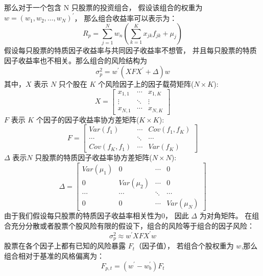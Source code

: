 \documentclass[UTF8,11pt]{ctexart}
\begin{document}
那么对于一个包含 N 只股票的投资组合， 假设该组合的权重为  $w=(w_1,w_2,\ldots,w_N)^\prime$， 那么组合收益率可以表示为：
\begin{equation}
R_p=\sum_{j=1}^{N}w_n(\sum_{k=1}^{K}x_{jk}f_{jk}+\mu_j)
\end{equation}
假设每只股票的特质因子收益率与共同因子收益率不想管， 并且每只股票的特质因子收益率也不相关。那么组合的风险结构为
\begin{equation}
\sigma_p^2=w^\prime(XFX^\prime+\Delta)w
\end{equation}
其中，$X$ 表示 $N$ 只个股在 $K$ 个风险因子上的因子载荷矩阵($N \times K$):
\begin{equation}
	X=\begin{bmatrix}
	x_{1,1} & \cdots & x_{1,K}\\
	\vdots & \ddots & \vdots\\
	x_{N,1} & \cdots & x_{N,K}
	\end{bmatrix}
\end{equation}
$F$ 表示 $K$ 个因子的因子收益率协方差矩阵($K \times K$):
\begin{equation}
F=\begin{bmatrix}
Var(f_1) & \cdots & Cov(f_1,f_K)\\
\cdots & \ddots & \cdots\\
Cov(f_K,f_1) & \cdots & Var(f_K)
\end{bmatrix}
\end{equation}
$\Delta$ 表示$N$ 只股票的特质因子收益率协方差矩阵($N \times N$):
\begin{equation}
\Delta=\begin{bmatrix}
Var(\mu_1) & 0 & \cdots &0\\
0 &Var(\mu_2)& \cdots & 0\\
\cdots & \cdots &\ddots & \cdots\\
0 & 0 & \cdots & Var(\mu_N)
\end{bmatrix}
\end{equation}
由于我们假设每只股票的特质因子收益率相关性为0， 因此 $\Delta$ 为对角矩阵。
在组合充分分散或者股票个股风险有限的假设下，组合的风险等于组合的因子风险：
\begin{equation}
\sigma_p^2 \approx w^\prime X F X^\prime w
\end{equation}
股票在各个因子上都有已知的风险暴露 $F_t$（因子值）， 若组合个股权重为 $w$,那么组合相对于基准的风格偏离为：
\begin{equation}
F_{p,t}=(w^\prime-w_b^\prime) F_t
\end{equation}
\end{document}
